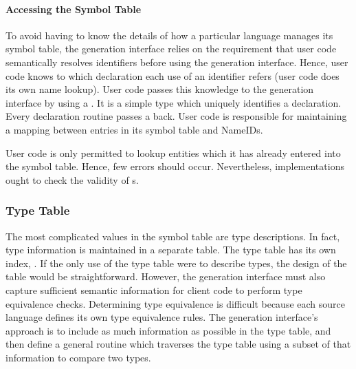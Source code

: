 \paragraph{Accessing the Symbol Table}

To avoid having to know the details of how a particular language
manages its symbol table, the generation interface relies on the
requirement that user code semantically resolves identifiers before
using the generation interface.  Hence, user code knows to which
declaration each use of an identifier refers (\ie user code does its
own name lookup).  User code passes this knowledge to the generation
interface by using a .  It is a simple type which uniquely
identifies a declaration.  Every declaration routine passes a
 back.  User code is responsible for maintaining a mapping
between entries in its symbol table and NameIDs.

User code is only permitted to lookup entities which it has already
entered into the symbol table.  Hence, few errors should occur.
Nevertheless, implementations ought to check the validity of
s. 


\subsubsection{Type Table}

The most complicated values in the symbol table are type descriptions.
In fact, type information is maintained in a separate table.  The type
table has its own index, .  If the only use of the type
table were to describe types, the design of the table would be
straightforward.  However, the generation interface must also capture
sufficient semantic information for client code to perform type
equivalence checks.  Determining type equivalence is difficult because
each source language defines its own type equivalence rules.  The
generation interface's approach is to include as much information as
possible in the type table, and then define a general routine which
traverses the type table using a subset of that information to compare
two types.  

